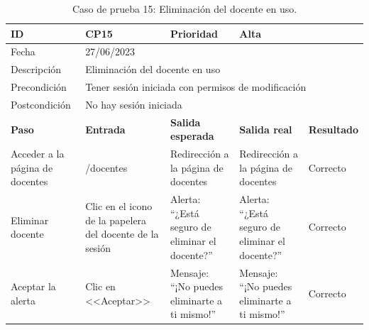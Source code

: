 \begin{table}[H]
\small
\begin{tabular}{p{} p{} p{} p{} p{}}
\cellcolor{gray!25}
ID   & CP15 & \cellcolor{gray!25} Prioridad   & Alta \\ \hline
\cellcolor{gray!25} Fecha	&	\multicolumn{4}{l}{27/06/2023} \\ \hline
\cellcolor{gray!25} Descripción		&	\multicolumn{4}{l}{Eliminación del docente en uso} \\ \hline                                            
\cellcolor{gray!25}
Precondición  & \multicolumn{4}{p{.66\textwidth}}{Tener sesión iniciada con permisos de modificación} \\ \hline
\cellcolor{gray!25} Postcondición & \multicolumn{4}{l}{No hay sesión iniciada}                                                    \\ \hline
\rowcolor{gray!25}
\textbf{Paso}   & \textbf{Entrada} & \textbf{Salida esperada} & \textbf{Salida real} & \textbf{Resultado} \\ \hline
Acceder a la página de docentes 
& /docentes                                                                          
& Redirección a la página de docentes                                   
& Redirección a la página de docentes                                   
& Correcto                            
\\ \hline
Eliminar docente
& Clic en el icono de la papelera del docente de la sesión
& Alerta: ``¿Está seguro de eliminar el docente?''
& Alerta: ``¿Está seguro de eliminar el docente?''
& Correcto
\\ \hline
Aceptar la alerta
& Clic en <<Aceptar>>
& Mensaje: ``¡No puedes eliminarte a ti mismo!''                      
& Mensaje: ``¡No puedes eliminarte a ti mismo!''   
& Correcto                            
\\ \hline              
\end{tabular}
\caption{Caso de prueba 15: Eliminación del docente en uso.}\label{table:CP15}
\end{table}

